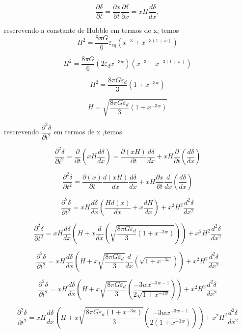 \documentclass[a4paper,12pt]{article}
\begin{document}
$$\dfrac{\partial \delta}{\partial t } = \dfrac{\partial x}{\partial t } \dfrac{\partial \delta}{\partial x }= xH \dfrac{d \delta}{d x },$$

rescrevendo a constante de Hubble em termos de x, temos
$$H^2 = \dfrac{8\pi G}{6}\varepsilon_{eq}\left( x^{-3} +x^{-3 (1+w)}\right)$$

$$H^2 = \dfrac{8\pi G}{6}\left( 2\varepsilon_{d}x^{-3w}\right)\left( x^{-3} +x^{-3 (1+w)}\right)$$

$$H^2 = \dfrac{8\pi G\varepsilon_{d}}{3}\left( 1 +x^{-3w}\right)$$

$$H = \sqrt{\dfrac{8\pi G\varepsilon_{d}}{3}\left( 1 +x^{-3w}\right)}$$

rescrevendo $\dfrac{\partial^2 \delta}{\partial t^2}$ em termos de x ,temos

$$\dfrac{\partial^2 \delta}{\partial t^2} = \dfrac{\partial }{\partial t }\left(xH \dfrac{d \delta}{d x } \right)= \dfrac{\partial (xH) }{\partial t }\dfrac{d \delta}{d x } + xH\dfrac{\partial }{\partial t }\left( \dfrac{d \delta}{d x } \right)$$

$$\dfrac{\partial^2 \delta}{\partial t^2} =\dfrac{\partial (x) }{\partial t }\dfrac{d(xH) }{dx }\dfrac{d \delta}{d x } + xH\dfrac{\partial x}{\partial t }\dfrac{d}{dx }\left( \dfrac{d \delta}{d x } \right)$$

$$\dfrac{\partial^2 \delta}{\partial t^2} = xH\dfrac{d \delta}{d x }\left( \dfrac{Hd(x) }{dx } + x\dfrac{dH }{dx }\right) + x^2H^2 \dfrac{d^2 \delta}{d x^2 }$$

$$\dfrac{\partial^2 \delta}{\partial t^2} = xH\dfrac{d \delta}{d x }\left( H + x\dfrac{d }{dx }\left( \sqrt{\dfrac{8\pi G\varepsilon_{d}}{3}\left( 1 +x^{-3w}\right)}\right)\right) + x^2H^2 \dfrac{d^2 \delta}{d x^2 }$$

$$\dfrac{\partial^2 \delta}{\partial t^2} = xH\dfrac{d \delta}{d x }\left( H + x\sqrt{\dfrac{8\pi G\varepsilon_{d}}{3}}\dfrac{d }{dx }\left(\sqrt{  1 +x^{-3w}} \right)\right) + x^2H^2 \dfrac{d^2 \delta}{d x^2 }$$

$$\dfrac{\partial^2 \delta}{\partial t^2} = xH\dfrac{d \delta}{d x }\left( H + x\sqrt{\dfrac{8\pi G\varepsilon_{d}}{3}} \left(\dfrac{-3wx^{-3w -1}}{2\sqrt{1 +x^{-3w}}} \right)\right) + x^2H^2 \dfrac{d^2 \delta}{d x^2 }$$

$$\dfrac{\partial^2 \delta}{\partial t^2} = xH\dfrac{d \delta}{d x }\left( H + x\sqrt{\dfrac{8\pi G\varepsilon_{d}(1 +x^{-3w})}{3}} \left(\dfrac{-3wx^{-3w -1}}{2(1 +x^{-3w})} \right)\right) + x^2H^2 \dfrac{d^2 \delta}{d x^2 }$$
\end{document}
